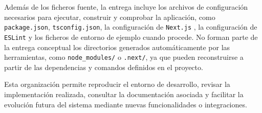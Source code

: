 Además de los ficheros fuente, la entrega incluye los archivos de configuración necesarios para ejecutar, construir y comprobar la aplicación, como \texttt{package.json}, \texttt{tsconfig.json}, la configuración de \texttt{Next.js} \citep{nextjsdocs2026}, la configuración de \texttt{ESLint} \citep{eslintdocs2026} y los ficheros de entorno de ejemplo cuando procede. No forman parte de la entrega conceptual los directorios generados automáticamente por las herramientas, como \texttt{node\_modules/} o \texttt{.next/}, ya que pueden reconstruirse a partir de las dependencias y comandos definidos en el proyecto.

Esta organización permite reproducir el entorno de desarrollo, revisar la implementación realizada, consultar la documentación asociada y facilitar la evolución futura del sistema mediante nuevas funcionalidades o integraciones.
